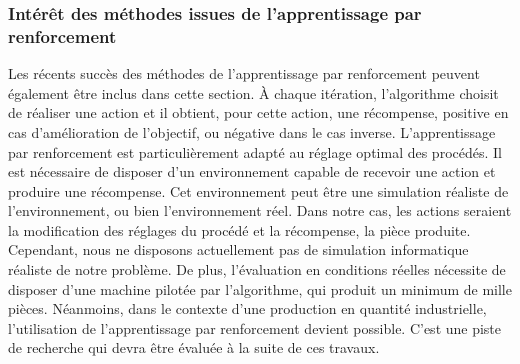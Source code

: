 \subsubsection{Intérêt des méthodes issues de l'apprentissage par renforcement}
Les récents succès des méthodes de l'apprentissage par renforcement peuvent également être inclus dans cette section.
À chaque itération, l'algorithme choisit de réaliser une action et il obtient, pour cette action, une récompense, positive en cas d'amélioration de l'objectif, ou négative dans le cas inverse.
L'apprentissage par renforcement est particulièrement adapté au réglage optimal des procédés.
Il est nécessaire de disposer d'un environnement capable de recevoir une action et produire une récompense.
Cet environnement peut être une simulation réaliste de l'environnement, ou bien l'environnement réel.
Dans notre cas, les actions seraient la modification des réglages du procédé et la récompense, la pièce produite.
Cependant, nous ne disposons actuellement pas de simulation informatique réaliste de notre problème. De plus, l'évaluation en conditions réelles nécessite de disposer d'une machine pilotée par l'algorithme, qui produit un minimum de mille pièces.
Néanmoins, dans le contexte d'une production en quantité industrielle, l'utilisation de l'apprentissage par renforcement devient possible. C'est une piste de recherche qui devra être évaluée à la suite de ces travaux.






